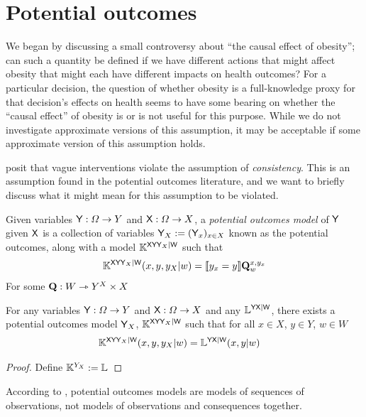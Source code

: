 

\section{Potential outcomes}\label{sec:potential_outcomes}

We began by discussing a small controversy about ``the causal effect of obesity''; can such a quantity be defined if we have different actions that might affect obesity that might each have different impacts on health outcomes? For a particular decision, the question of whether obesity is a full-knowledge proxy for that decision's effects on health seems to have some bearing on whether the ``causal effect'' of obesity is or is not useful for this purpose. While we do not investigate approximate versions of this assumption, it may be acceptable if some approximate version of this assumption holds.

\citet{hernan_does_2008,noauthor_does_2016} posit that vague interventions violate the assumption of \emph{consistency}. This is an assumption found in the potential outcomes literature, and we want to briefly discuss what it might mean for this assumption to be violated.

\begin{definition}\label{def:potential_outcomes}
Given variables $\mathsf{Y}:\Omega\to Y$ and $\mathsf{X}:\Omega\to X$, a \emph{potential outcomes model} of $\mathsf{Y}$ given $\mathsf{X}$ is a collection of variables $\mathsf{Y}_X:=(\mathsf{Y}_x)_{x\in X}$ known as the potential outcomes, along with a model $\mathbb{K}^{\mathsf{XYY}_X|\mathsf{W}}$ such that
\begin{align}
    \mathbb{K}^{\mathsf{XYY}_X|\mathsf{W}}(x,y,y_X|w) = \llbracket y_x=y \rrbracket \mathbf{Q}^{x,y_x}_{w}
\end{align}
For some $\mathbf{Q}:W\rightarrowtriangle Y^X\times X$
\end{definition}

\begin{lemma}
For any variables $\mathsf{Y}:\Omega\to Y$ and $\mathsf{X}:\Omega\to X$ and any $\mathbb{L}^{\mathsf{YX}|\mathsf{W}}$, there exists a potential outcomes model $\mathsf{Y}_X$, $\mathbb{K}^{\mathsf{XYY}_X|\mathsf{W}}$ such that for all $x\in X$, $y\in Y$, $w\in W$
\begin{align}
    \mathbb{K}^{\mathsf{XYY}_X|\mathsf{W}}(x,y,y_X|w) &= \mathbb{L}^{\mathsf{YX}|\mathsf{W}}(x,y|w)
\end{align}
\end{lemma}

\begin{proof}
Define $\mathbb{K}^{Y_X}:=\mathbb{L}$
\end{proof}

According to \citet{rubin_causal_2005}, potential outcomes models are models of sequences of observations, not models of observations and consequences together.